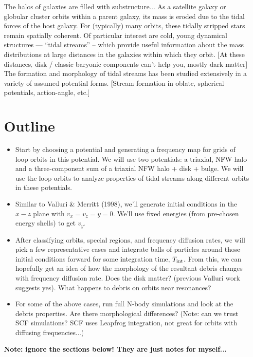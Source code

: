 \documentclass[letterpaper,12pt,preprint]{aastex}
\begin{document}
The halos of galaxies are filled with substructure...
As a satellite galaxy or globular cluster orbits within a parent galaxy, its mass is eroded due to the tidal forces of the host galaxy. For (typically) many orbits, these tidally stripped stars remain spatially coherent.
Of particular interest are cold, young dynamical structures --- ``tidal streams'' -- which provide useful information about the mass distributions at large distances in the galaxies within which they orbit. [At these distances, disk / classic baryonic components can't help you, mostly dark matter]
The formation and morphology of tidal streams has been studied extensively in a variety of assumed potential forms. [Stream formation in oblate, spherical potentials, action-angle, etc.]

\section{Outline}
\begin{itemize}
\item Start by choosing a potential and generating a frequency map for grids of loop orbits in this potential. We will use two potentials: a triaxial, NFW halo and a three-component sum of a triaxial NFW halo + disk + bulge. We will use the loop orbits to analyze properties of tidal streams along different orbits in these potentials.
\item Similar to Valluri \& Merritt (1998), we'll generate initial conditions in the $x-z$ plane with $v_x = v_z = y=0$. We'll use fixed energies (from pre-chosen energy shells) to get $v_y$. 
\item After classifying orbits, special regions, and frequency diffusion rates, we will pick a few representative cases and integrate balls of particles around those initial conditions forward for some integration time, $T_{\rm int}$. From this, we can hopefully get an idea of how the morphology of the resultant debris changes with frequency diffusion rate. Does the disk matter? (previous Valluri work suggests yes). What happens to debris on orbits near resonances?
\item For some of the above cases, run full N-body simulations and look at the debris properties. Are there morphological differences? (Note: can we trust SCF simulations? SCF uses Leapfrog integration, not great for orbits with diffusing frequencies...)

\end{itemize}

{\bf Note: ignore the sections below! They are just notes for myself...}
\end{document}
